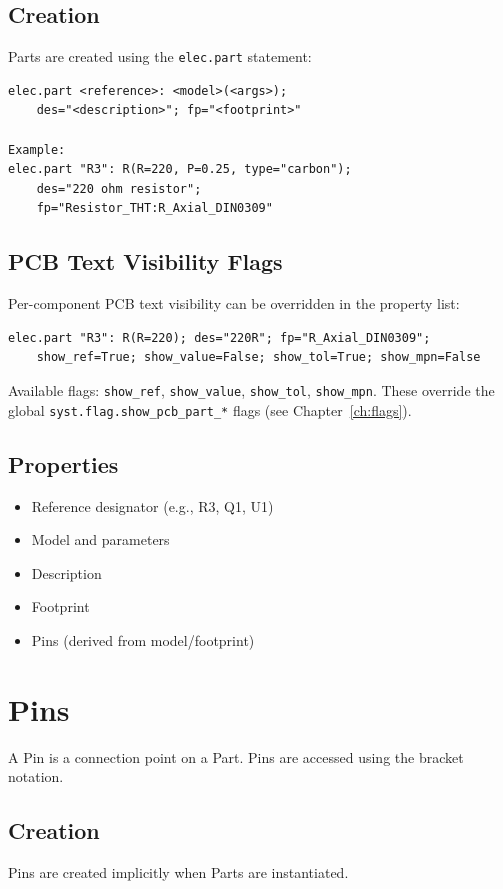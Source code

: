 \subsection{Creation}
\label{sec:part-creation}
Parts are created using the \texttt{elec.part} statement:
\begin{verbatim}
elec.part <reference>: <model>(<args>); 
    des="<description>"; fp="<footprint>"

Example:
elec.part "R3": R(R=220, P=0.25, type="carbon"); 
    des="220 ohm resistor"; 
    fp="Resistor_THT:R_Axial_DIN0309"
\end{verbatim}

\subsection{PCB Text Visibility Flags}
Per-component PCB text visibility can be overridden in the property list:
\begin{verbatim}
elec.part "R3": R(R=220); des="220R"; fp="R_Axial_DIN0309";
    show_ref=True; show_value=False; show_tol=True; show_mpn=False
\end{verbatim}
Available flags: \texttt{show\_ref}, \texttt{show\_value}, \texttt{show\_tol}, \texttt{show\_mpn}. These override the global \texttt{syst.flag.show\_pcb\_part\_*} flags (see Chapter~\ref{ch:flags}).

\subsection{Properties}
\begin{itemize}
\item Reference designator (e.g., R3, Q1, U1)
\item Model and parameters
\item Description
\item Footprint
\item Pins (derived from model/footprint)
\end{itemize}

\section{Pins}
A Pin is a connection point on a Part. Pins are accessed using the bracket notation.

\subsection{Creation}
Pins are created implicitly when Parts are instantiated.

